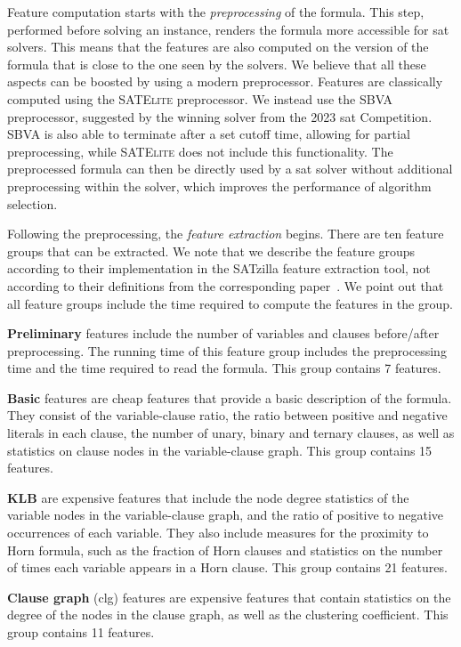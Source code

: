 Feature computation starts with the \emph{preprocessing} of the formula. This step, performed before solving an instance, renders the formula more accessible for \gls{sat} solvers. This means that the features are also computed on the version of the formula that is close to the one seen by the solvers. We believe that all these aspects can be boosted by using a modern preprocessor.
Features are classically computed using the \textsc{SATElite} preprocessor. We instead use the SBVA preprocessor, suggested by the winning solver from the 2023 \gls{sat} Competition. SBVA is also able to terminate after a set cutoff time, allowing for partial preprocessing, while \textsc{SATElite} does not include this functionality.
The preprocessed formula can then be directly used by a \gls{sat} solver without additional preprocessing within the solver, which improves the performance of algorithm selection.


Following the preprocessing, the \emph{feature extraction} begins. There are ten feature groups that can be extracted. We note that we describe the feature groups according to their implementation in the SATzilla feature extraction tool, not according to their definitions from the corresponding paper~\cite{HutEtAl14}. We point out that all feature groups include the time required to compute the features in the group.


\noindent\textbf{Preliminary} features include the number of variables and clauses before/after preprocessing. The running time of this feature group includes the preprocessing time and the time required to read the formula. This group contains 7 features.

\noindent\textbf{Basic} features are cheap features that provide a basic description of the formula. They consist of the variable-clause ratio, the ratio between positive and negative literals in each clause, the number of unary, binary and ternary clauses, as well as statistics on clause nodes in the variable-clause graph. This group contains 15 features.

\noindent\textbf{KLB} are expensive features that include the node degree statistics of the variable nodes in the variable-clause graph, and the ratio of positive to negative occurrences of each variable. They also include measures for the proximity to Horn formula, such as the fraction of Horn clauses and statistics on the number of times each variable appears in a Horn clause. This group contains 21 features.

\noindent\textbf{Clause graph} (\gls{clg}) features are expensive features that contain statistics on the degree of the nodes in the clause graph, as well as the clustering coefficient. This group contains 11 features.

